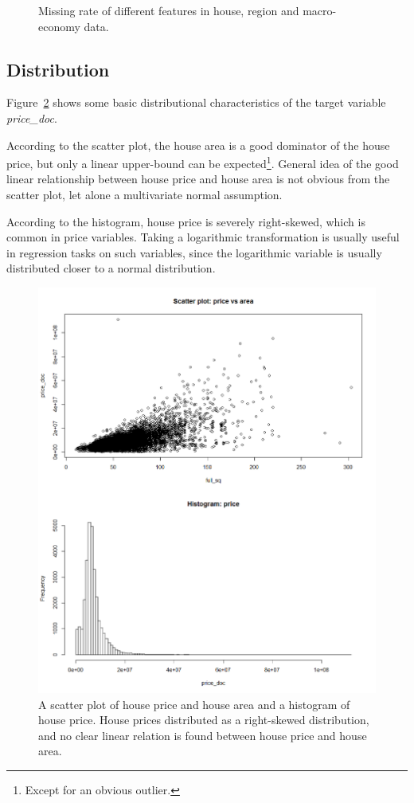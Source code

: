 \documentclass{article}
\begin{document}
\begin{figure}[ht]
\begin{center}
\caption{Missing rate of different features in house, region and macro-economy data.}
\label{fig1}
\end{center}
\vskip -0.2in
\end{figure}

\subsection{Distribution}
Figure~\ref{fig2} shows some basic distributional characteristics of the target variable \textit{price\_doc}.

According to the scatter plot, the house area is a good dominator of the house price, but only a linear upper-bound can be expected\footnote{Except for an obvious outlier.}. General idea of the good linear relationship between house price and house area is not obvious from the scatter plot, let alone a multivariate normal assumption.

According to the histogram, house price is severely right-skewed, which is common in price variables. Taking a logarithmic transformation is usually useful in regression tasks on such variables, since the logarithmic variable is usually distributed closer to a normal distribution.

\begin{figure}[ht]
\vskip 0.2in
\begin{center}
\centerline{\includegraphics[width=\columnwidth]{distrib}}
\caption{A scatter plot of house price and house area and a histogram of house price. House prices distributed as a right-skewed distribution, and no clear linear relation is found between house price and house area.}
\label{fig2}
\end{center}
\vskip -0.2in
\end{figure}
\end{document}
